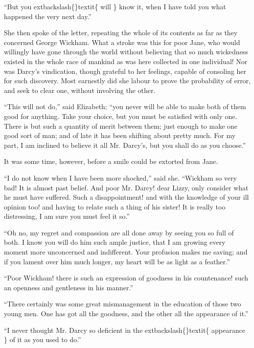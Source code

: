 \documentclass[10pt]{book}
\begin{document}
   “But you
   	extbackslash\{\}textit\{
    will
   \}
   know it, when I have told you what happened the very
next day.”
  

   She then spoke of the letter, repeating the whole of its contents as far
as they concerned George Wickham. What a stroke was this for poor Jane,
who would willingly have gone through the world without believing that
so much wickedness existed in the whole race of mankind as was here
collected in one individual! Nor was Darcy’s vindication, though
grateful to her feelings, capable of consoling her for such discovery.
Most earnestly did she labour to prove the probability of error, and
seek to clear one, without involving the other.
  

   “This will not do,” said Elizabeth; “you never will be able to make both
of them good for anything. Take your choice, but you must be satisfied
with only one. There is but such a quantity of merit between them; just
enough to make one good sort of man; and of late it has been shifting
about pretty much. For my part, I am inclined to believe it all Mr.
Darcy’s, but you shall do as you choose.”
  

   It was some time, however, before a smile could be extorted from Jane.
  

   “I do not know when I have been more shocked,” said she. “Wickham so
very bad! It is almost past belief.
   And poor Mr. Darcy! dear Lizzy,
only consider what he must have suffered. Such a disappointment! and
with the knowledge of your ill opinion too! and having to relate such a
thing of his sister! It is really too distressing, I am sure you must
feel it so.”
  

   “Oh no, my regret and compassion are all done away by seeing you so full
of both. I know you will do him such ample justice, that I am growing
every moment more unconcerned and indifferent. Your profusion makes me
saving; and if you lament over him much longer, my heart will be as
light as a feather.”
  

   “Poor Wickham! there is such an expression of goodness in his
countenance! such an openness and gentleness in his manner.”
  

   “There certainly was some great mismanagement in the education of those
two young men. One has got all the goodness, and the other all the
appearance of it.”
  

   “I never thought Mr. Darcy so deficient in the
   	extbackslash\{\}textit\{
    appearance
   \}
   of it as you
used to do.”
  
\end{document}
